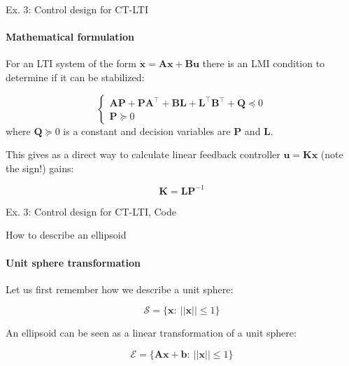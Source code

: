 \documentclass{beamer}
\begin{document}
\begin{frame}{Ex. 3: Control design for CT-LTI}
\framesubtitle{Mathematical formulation}
\begin{flushleft}

For an LTI system of the form $\dot{\mathbf{x}} = \mathbf{A}\mathbf{x} + \mathbf{B}\mathbf{u}$ there is an LMI condition to determine if it can be stabilized:

\begin{equation}
    \begin{cases}
        \mathbf{A}\mathbf{P} + \mathbf{P}     \mathbf{A}^\top + \mathbf{B}\mathbf{L} + \mathbf{L}^\top\mathbf{B}^\top + \mathbf{Q} \preceq 0 \\
        \mathbf{P} \succeq 0
    \end{cases}
\end{equation}
%
where $\mathbf{Q} \succeq 0$ is a constant and decision variables are $\mathbf{P}$ and $\mathbf{L}$. 

\bigskip

This gives as a direct way to calculate linear feedback controller $\mathbf{u} = \mathbf{K}\mathbf{x}$ (note the sign!) gains:

\begin{equation}
    \mathbf{K} = \mathbf{L}\mathbf{P}^{-1}
\end{equation}

\end{flushleft}
\end{frame}




\begin{frame}{Ex. 3: Control design for CT-LTI, Code}
\begin{flushleft}



\end{flushleft}
\end{frame}






\begin{frame}{How to describe an ellipsoid}
\framesubtitle{Unit sphere transformation}
\begin{flushleft}

Let us first remember how we describe a unit sphere:

\begin{equation}
    \mathcal{S} = \{ \mathbf{x}: \ || \mathbf{x} || \leq 1 \}
\end{equation}

An ellipsoid can be seen as a linear transformation of a unit sphere: 

\begin{equation}
    \mathcal{E} = \{ \mathbf{A}\mathbf{x} + \mathbf{b}: \ || \mathbf{x} || \leq 1 \}
\end{equation}
 
\end{flushleft}
\end{frame}
\end{document}
